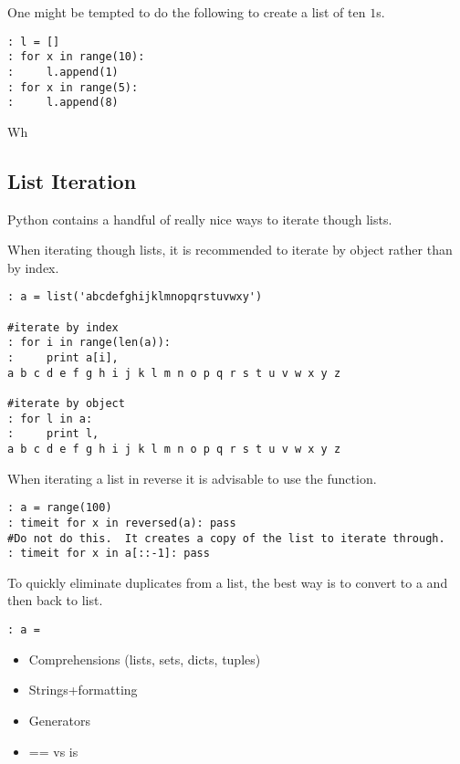 One might be tempted to do the following to create a list of ten $1$s.
\begin{lstlisting}
: l = []
: for x in range(10):
:     l.append(1)
: for x in range(5):
:     l.append(8)
\end{lstlisting}
Wh


\subsection*{List Iteration}
Python contains a handful of really nice ways to iterate though lists.

When iterating though lists, it is recommended to iterate by object rather than by index.
\begin{lstlisting}
: a = list('abcdefghijklmnopqrstuvwxy')

#iterate by index
: for i in range(len(a)):
:     print a[i],
a b c d e f g h i j k l m n o p q r s t u v w x y z

#iterate by object
: for l in a:
:     print l,
a b c d e f g h i j k l m n o p q r s t u v w x y z
\end{lstlisting}

When iterating a list in reverse it is advisable to use the  function.
\begin{lstlisting}
: a = range(100)
: timeit for x in reversed(a): pass
#Do not do this.  It creates a copy of the list to iterate through.
: timeit for x in a[::-1]: pass
\end{lstlisting}

To quickly eliminate duplicates from a list, the best way is to convert to a 
and then back to list.
\begin{lstlisting}
: a = 
\end{lstlisting}




\begin{itemize}
\item Comprehensions (lists, sets, dicts, tuples)
\item Strings+formatting
\item Generators
\item == vs is
\end{itemize}